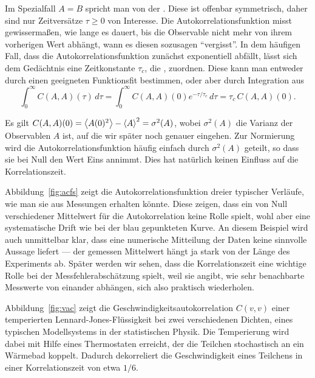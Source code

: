 Im Spezialfall $A=B$ spricht man von der
\emph{}. Diese ist offenbar
symmetrisch, daher sind nur Zeitversätze $\tau\ge 0$ von
Interesse. Die Autokorrelationsfunktion misst gewissermaßen, wie lange
es dauert, bis die Observable nicht mehr von ihrem vorherigen Wert
abhängt, wann es diesen sozusagen "`vergisst"'. In dem häufigen Fall,
dass die Autokorrelationsfunktion zunächst exponentiell abfällt, lässt
sich dem Gedächtnis eine Zeitkonstante $\tau_c$, die
\emph{}, zuordnen. Diese kann man entweder
durch einen geeigneten Funktionsfit bestimmen, oder aber durch
Integration aus
\begin{equation}
  \label{eq:tauc}
  \int_{0}^{\infty} C(A,A)(\tau)\,d\tau = \int_{0}^{\infty}
  C(A,A)(0)e^{-\tau/\tau_c}\,d\tau = \tau_c\,C(A,A)(0).
\end{equation}

Es gilt $C(A,A)(0) = \left\langle{A(0)^2}\right\rangle - \left\langle{A}\right\rangle^2 = \sigma^2(A)$, wobei
$\sigma^2(A)$ die Varianz der Observablen $A$ ist, auf die wir später noch
genauer eingehen. Zur Normierung wird die Autokorrelationsfunktion häufig
einfach durch $\sigma^2(A)$ geteilt, so dass sie bei Null den Wert Eins
annimmt. Dies hat natürlich keinen Einfluss auf die Korrelationszeit.

Abbildung~\ref{fig:acfs} zeigt die Autokorrelationsfunktion dreier
typischer Verläufe, wie man sie aus Messungen erhalten könnte. Diese
zeigen, dass ein von Null verschiedener Mittelwert für die Autokorrelation
keine Rolle spielt, wohl aber eine systematische Drift wie bei der blau
gepunkteten Kurve. An diesem Beispiel wird auch unmittelbar klar, dass eine
numerische Mitteilung der Daten keine sinnvolle Aussage liefert --- der
gemessen Mittelwert hängt ja stark von der Länge des Experiments ab. Später
werden wir sehen, dass die Korrelationszeit eine wichtige Rolle bei der
Messfehlerabschätzung spielt, weil sie angibt, wie sehr benachbarte Messwerte
von einander abhängen, sich also praktisch wiederholen.

Abbildung~\ref{fig:vac} zeigt die Geschwindigkeitsautokorrelation
$C(v,v)$ einer temperierten Lennard-Jones-Flüs\-sig\-ke\-it bei zwei
verschiedenen Dichten, eines typischen Modellsystems in der
statistischen Physik. Die Temperierung wird dabei mit Hilfe eines
Thermostaten erreicht, der die Teilchen stochastisch an ein Wärmebad
koppelt. Dadurch dekorreliert die Geschwindigkeit eines Teilchens in
einer Korrelationszeit von etwa $1/6$.

